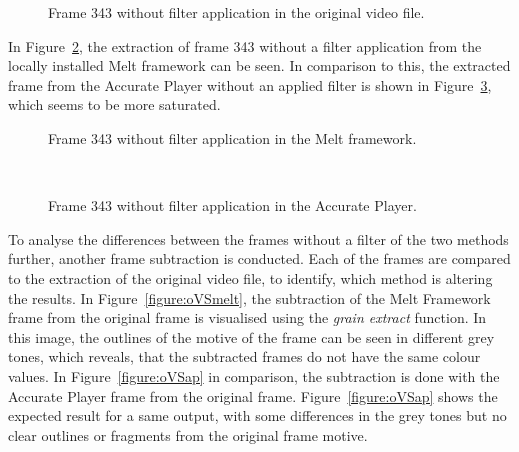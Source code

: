 \documentclass[../MasterThesis.tex]{subfiles}
\begin{document}
\begin{figure}[H]
	\begin{center}
		\caption[Frame 343 without filter application in the original video file.]{Frame 343 without filter application in the original video file.}
		\label{figure:nofilterO}
	\end{center}
\end{figure}


In Figure~\ref{figure:nofilterMelt}, the extraction of frame 343 without a filter application from the locally installed Melt framework can be seen. In comparison to this, the extracted frame from the Accurate Player without an applied filter is shown in Figure~\ref{figure:nofilterAP}, which seems to be more saturated.


\begin{minipage}{0.48\textwidth}
	\begin{figure}[H]
		\begin{center}
			\caption[Frame 343 without filter application in the Melt framework.]{Frame 343 without filter application in the Melt framework.}
			\label{figure:nofilterMelt}
		\end{center}
	\end{figure}
\end{minipage}\begin{minipage}{0.04\textwidth}
	\ 
\end{minipage}\begin{minipage}{0.48\textwidth}
	\begin{figure}[H]
		\begin{center}
			\caption[Frame 343 without filter application in the Accurate Player.]{Frame 343 without filter application in the Accurate Player.}
			\label{figure:nofilterAP}
		\end{center}
	\end{figure}
\end{minipage}

\vspace*{1.5em}
To analyse the differences between the frames without a filter of the two methods further, another frame subtraction is conducted. Each of the frames are compared to the extraction of the original video file, to identify, which method is altering the results.
In Figure~\ref{figure:oVSmelt}, the subtraction of the Melt Framework frame from the original frame is visualised using the \textit{grain extract} function. In this image, the outlines of the motive of the frame can be seen in different grey tones, which reveals, that the subtracted frames do not have the same colour values.
In Figure~\ref{figure:oVSap} in comparison, the subtraction is done with the Accurate Player frame from the original frame. Figure~\ref{figure:oVSap} shows the expected result for a same output, with some differences in the grey tones but no clear outlines or fragments from the original frame motive.
\end{document}
